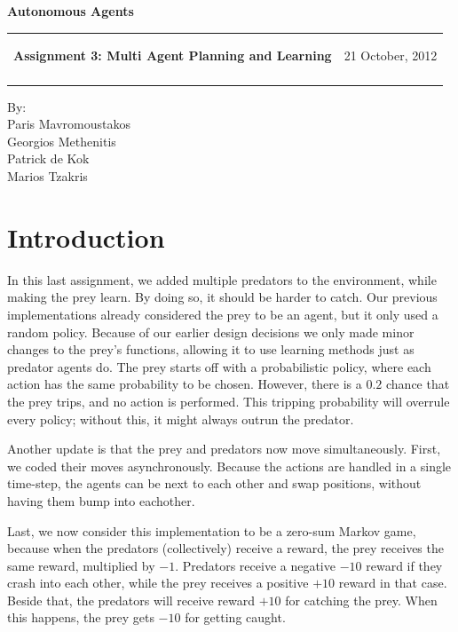 \documentclass[a4paper,11pt]{article}
\makeatletter
\newcommand{\resheading}[1]{{\large \colorbox{mygrey}{\begin{minipage}{\textwidth}{\textbf{#1 \vphantom{p\^{E}}}}\end{minipage}}}}
\newcommand{\mywebheader}{
  \begin{tabular}{@{}p{5in}p{4in}}
  {\resheading{Assignment 3: Multi Agent Planning and Learning}} & {\Large 21 October, 2012}\\\vspace{0.2cm}
  \end{tabular}}
\makeatother
\begin{document}
\begin{center}
{\LARGE \textbf{Autonomous Agents}}\\ [1em]
\end{center}
\mywebheader

\begin{center}
{\Large By:} \\ \vspace{0.1cm}
{\Large Paris Mavromoustakos} \\  \vspace{0.1cm}
{\Large Georgios Methenitis} \\ \vspace{0.1cm}
{\Large Patrick de Kok} \\ \vspace{0.1cm}
{\Large Marios Tzakris}
\end{center}


\section{Introduction}

In this last assignment, we added multiple predators to the environment, while making the prey learn.  By doing so, it should be harder to catch. Our previous implementations already considered the prey to be an agent, but it only used a random policy. Because of our earlier design decisions we only made minor changes to the prey's functions, allowing it to use learning methods just as predator agents do. The prey starts off with a probabilistic policy, where each action has the same probability to be chosen.  However, there is a $0.2$ chance that the prey trips, and no action is performed.  This tripping probability will overrule every policy; without this, it might always outrun the predator.

Another update is that the prey and predators now move simultaneously.  First, we coded their moves asynchronously. Because the actions are handled in a single time-step, the agents can be next to each other and swap positions, without having them bump into eachother.

Last, we now consider this implementation to be a zero-sum Markov game, because when the predators (collectively) receive a reward, the prey receives the same reward, multiplied by $-1$.  Predators receive a negative $-10$ reward if they crash into each other, while the prey receives a positive $+10$ reward in that case. Beside that, the predators will receive reward $+10$ for catching the prey.  When this happens, the prey gets $-10$ for getting caught.
\end{document}
